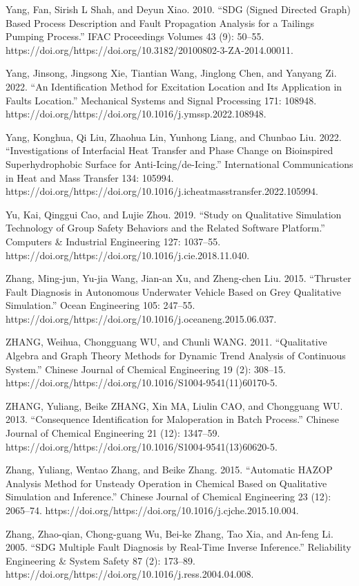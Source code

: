 \documentclass[utf8]{gradu3}
\begin{document}
Yang, Fan, Sirish L Shah, and Deyun Xiao. 2010. “SDG (Signed Directed Graph) Based Process Description and Fault Propagation Analysis for a Tailings Pumping Process.” IFAC Proceedings Volumes 43 (9): 50–55. https://doi.org/https://doi.org/10.3182/20100802-3-ZA-2014.00011.

Yang, Jinsong, Jingsong Xie, Tiantian Wang, Jinglong Chen, and Yanyang Zi. 2022. “An Identification Method for Excitation Location and Its Application in Faults Location.” Mechanical Systems and Signal Processing 171: 108948. https://doi.org/https://doi.org/10.1016/j.ymssp.2022.108948.

Yang, Konghua, Qi Liu, Zhaohua Lin, Yunhong Liang, and Chunbao Liu. 2022. “Investigations of Interfacial Heat Transfer and Phase Change on Bioinspired Superhydrophobic Surface for Anti-Icing/de-Icing.” International Communications in Heat and Mass Transfer 134: 105994. https://doi.org/https://doi.org/10.1016/j.icheatmasstransfer.2022.105994.

Yu, Kai, Qinggui Cao, and Lujie Zhou. 2019. “Study on Qualitative Simulation Technology of Group Safety Behaviors and the Related Software Platform.” Computers \& Industrial Engineering 127: 1037–55. https://doi.org/https://doi.org/10.1016/j.cie.2018.11.040.

Zhang, Ming-jun, Yu-jia Wang, Jian-an Xu, and Zheng-chen Liu. 2015. “Thruster Fault Diagnosis in Autonomous Underwater Vehicle Based on Grey Qualitative Simulation.” Ocean Engineering 105: 247–55. https://doi.org/https://doi.org/10.1016/j.oceaneng.2015.06.037.

ZHANG, Weihua, Chongguang WU, and Chunli WANG. 2011. “Qualitative Algebra and Graph Theory Methods for Dynamic Trend Analysis of Continuous System.” Chinese Journal of Chemical Engineering 19 (2): 308–15. https://doi.org/https://doi.org/10.1016/S1004-9541(11)60170-5.

ZHANG, Yuliang, Beike ZHANG, Xin MA, Liulin CAO, and Chongguang WU. 2013. “Consequence Identification for Maloperation in Batch Process.” Chinese Journal of Chemical Engineering 21 (12): 1347–59. https://doi.org/https://doi.org/10.1016/S1004-9541(13)60620-5.

Zhang, Yuliang, Wentao Zhang, and Beike Zhang. 2015. “Automatic HAZOP Analysis Method for Unsteady Operation in Chemical Based on Qualitative Simulation and Inference.” Chinese Journal of Chemical Engineering 23 (12): 2065–74. https://doi.org/https://doi.org/10.1016/j.cjche.2015.10.004.

Zhang, Zhao-qian, Chong-guang Wu, Bei-ke Zhang, Tao Xia, and An-feng Li. 2005. “SDG Multiple Fault Diagnosis by Real-Time Inverse Inference.” Reliability Engineering \& System Safety 87 (2): 173–89. https://doi.org/https://doi.org/10.1016/j.ress.2004.04.008.
\end{document}
